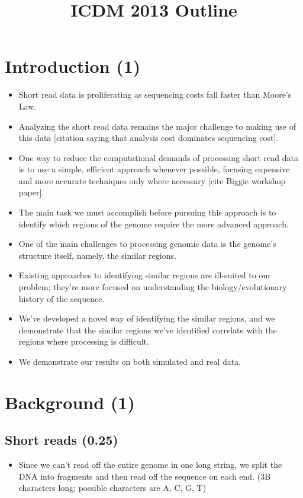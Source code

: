 \documentclass[10pt]{article}
\begin{document}
\title{ICDM 2013 Outline}
\maketitle

\abstract

\section{Introduction (1)} 

\begin{itemize}
\item{Short read data is proliferating as sequencing costs fall faster than Moore's Law.}
\item{Analyzing the short read data remains the major challenge to making use of this data [citation saying that analysis cost dominates sequencing cost].}
\item{One way to reduce the computational demands of processing short read data is to use a simple, efficient approach whenever possible, focusing expensive and more accurate techniques only where necessary [cite Biggie workshop paper].}
\item{The main task we must accomplish before pursuing this approach is to identify which regions of the genome require the more advanced approach.}
\item{One of the main challenges to processing genomic data is the genome's structure itself, namely, the similar regions.}
\item{Existing approaches to identifying similar regions are ill-suited to our problem; they're more focused on understanding the biology/evolutionary history of the sequence.}
\item{We've developed a novel way of identifying the similar regions, and we demonstrate that the similar regions we've identified correlate with the regions where processing is difficult.}
\item{We demonstrate our results on both simulated and real data.}
\end{itemize}

\section{Background (1)}

\subsection{Short reads (0.25)}
\begin{itemize}
\item{Since we can't read off the entire genome in one long string, we split the DNA into fragments and then read off the sequence on each end.  (3B characters long; possible characters are A, C, G, T)}
\end{itemize}
\end{document}

